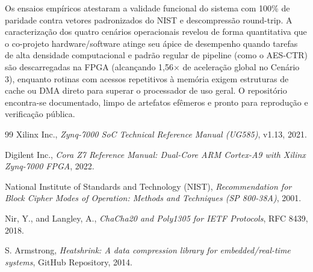\documentclass[11pt,a4paper]{article}
\begin{document}
Os ensaios empíricos atestaram a validade funcional do sistema com 100\% de paridade contra vetores padronizados do NIST e descompressão round-trip. A caracterização dos quatro cenários operacionais revelou de forma quantitativa que o co-projeto hardware/software atinge seu ápice de desempenho quando tarefas de alta densidade computacional e padrão regular de pipeline (como o AES-CTR) são descarregadas na FPGA (alcançando 1,56$\times$ de aceleração global no Cenário 3), enquanto rotinas com acessos repetitivos à memória exigem estruturas de cache ou DMA direto para superar o processador de uso geral. O repositório encontra-se documentado, limpo de artefatos efêmeros e pronto para reprodução e verificação pública.

\begin{thebibliography}{99}
Xilinx Inc., \emph{Zynq-7000 SoC Technical Reference Manual (UG585)}, v1.13, 2021.

Digilent Inc., \emph{Cora Z7 Reference Manual: Dual-Core ARM Cortex-A9 with Xilinx Zynq-7000 FPGA}, 2022.

National Institute of Standards and Technology (NIST), \emph{Recommendation for Block Cipher Modes of Operation: Methods and Techniques (SP 800-38A)}, 2001.

Nir, Y., and Langley, A., \emph{ChaCha20 and Poly1305 for IETF Protocols}, RFC 8439, 2018.

S. Armstrong, \emph{Heatshrink: A data compression library for embedded/real-time systems}, GitHub Repository, 2014.
\end{thebibliography}
\end{document}
